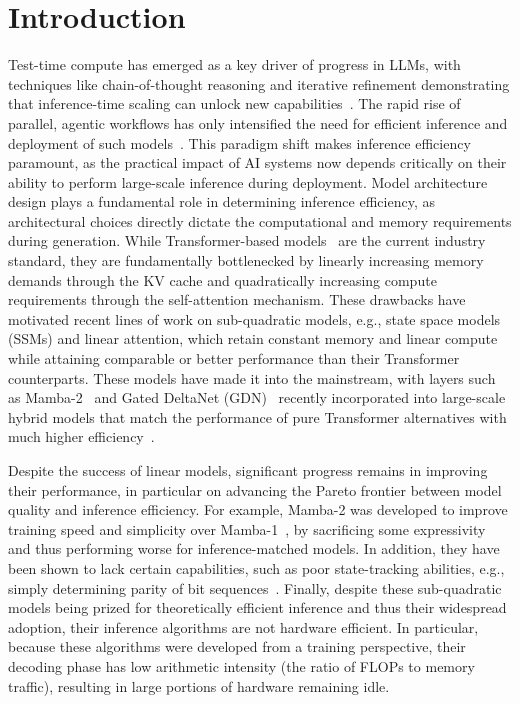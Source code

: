 \documentclass{article}
\newcommand{\citep}{\parencite}
\theoremstyle{plain}
\theoremstyle{definition}
\theoremstyle{remark}
\begin{document}
\section{Introduction}
Test-time compute has emerged as a key driver of progress in LLMs, with techniques like chain-of-thought reasoning and iterative refinement demonstrating that inference-time scaling can unlock new capabilities~\citep{wu2025inferencescalinglawsempirical,snell2024scalingllmtesttimecompute}.
The rapid rise of parallel, agentic workflows has only intensified the need for efficient inference and deployment of such models~\citep{openai_gpt53_codex_2026,anthropic_claude_opus_46_2026}.
This paradigm shift makes inference efficiency~\citep{kwon2023efficientmemorymanagementlarge,li2024llminferenceservingsurvey} paramount, as the practical impact of AI systems now depends critically on their ability to perform large-scale inference during deployment.
Model architecture design plays a fundamental role in determining inference efficiency, as architectural choices directly dictate the computational and memory requirements during generation.
While Transformer-based models~\citep{vaswani2017attention} are the current industry standard, they are fundamentally bottlenecked by linearly increasing memory demands through the KV cache and quadratically increasing compute requirements through the self-attention mechanism.
These drawbacks have motivated recent lines of work on sub-quadratic models, e.g., state space models (SSMs) and linear attention, which retain constant memory and linear compute while attaining comparable or better performance than their Transformer counterparts.
These models have made it into the mainstream, with layers such as Mamba-2~\citep{dao2024transformersssmsgeneralizedmodels} and Gated DeltaNet (GDN)~\citep{schlag2021deltarule,yang2025parallelizinglineartransformersdelta} recently incorporated into large-scale hybrid models that match the performance of pure Transformer alternatives with much higher efficiency~\citep{nvidia2025nemotronhfamilyaccurateefficient,qwen3technicalreport,kimiteam2025kimilinearexpressiveefficient,tencenthunyuanteam2025hunyuanturbosadvancinglargelanguage}.

Despite the success of linear models, significant progress remains in improving their performance, in particular on advancing the Pareto frontier between model quality and inference efficiency.
For example, Mamba-2 was developed to improve training speed and simplicity over Mamba-1~\citep{gu2024mambalineartimesequencemodeling}, by sacrificing some expressivity and thus performing worse for inference-matched models.
In addition, they have been shown to lack certain capabilities, such as poor state-tracking abilities, e.g., simply determining parity of bit sequences~\citep{grazzi2025unlockingstatetrackinglinearrnns,sarrof2024expressivecapacitystatespace}.
Finally, despite these sub-quadratic models being prized for theoretically efficient inference and thus their widespread adoption, their inference algorithms are not hardware efficient.
In particular, because these algorithms were developed from a training perspective, their decoding phase has low arithmetic intensity (the ratio of FLOPs to memory traffic), resulting in large portions of hardware remaining idle. 
\end{document}
